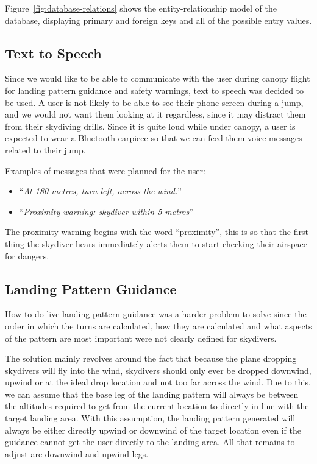 Figure~\ref{fig:database-relations} shows the entity-relationship model of the database, displaying primary and foreign keys and all of the possible entry values.

\subsection{Text to Speech}
Since we would like to be able to communicate with the user during canopy flight for landing pattern guidance and safety warnings, text to speech was decided to be used. A user is not likely to be able to see their phone screen during a jump, and we would not want them looking at it regardless, since it may distract them from their skydiving drills. Since it is quite loud while under canopy, a user is expected to wear a Bluetooth earpiece so that we can feed them voice messages related to their jump.

Examples of messages that were planned for the user:
\begin{itemize}
  \item ``\textit{At 180 metres, turn left, across the wind.}''
  \item ``\textit{Proximity warning: skydiver within 5 metres}''
\end{itemize}

The proximity warning begins with the word ``proximity'', this is so that the first thing the skydiver hears immediately alerts them to start checking their airspace for dangers.

\subsection{Landing Pattern Guidance}
How to do live landing pattern guidance was a harder problem to solve since the order in which the turns are calculated, how they are calculated and what aspects of the pattern are most important were not clearly defined for skydivers.

The solution mainly revolves around the fact that because the plane dropping skydivers will fly into the wind, skydivers should only ever be dropped downwind, upwind or at the ideal drop location and not too far across the wind. Due to this, we can assume that the base leg of the landing pattern will always be between the altitudes required to get from the current location to directly in line with the target landing area. With this assumption, the landing pattern generated will always be either directly upwind or downwind of the target location even if the guidance cannot get the user directly to the landing area. All that remains to adjust are downwind and upwind legs.

